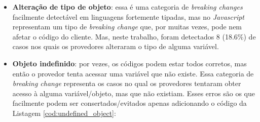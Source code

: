 \begin{itemize}

    \item \textbf{Alteração de tipo de objeto}: essa é uma categoria de \textit{breaking changes} facilmente detectável em linguagens fortemente tipadas, mas no \textit{Javascript} representam um tipo de \textit{breaking change} que, por muitas vezes, pode nem afetar o código do cliente. Mas, neste trabalho, foram detectados 8 (18.6\%) de casos nos quais os provedores alteraram o tipo de alguma variável.



    \item \textbf{Objeto indefinido}: por vezes, os códigos podem estar todos corretos, mas então o provedor tenta acessar uma variável que não existe. Essa categoria de \textit{breaking change} representa os casos no qual os provedores tentaram obter acesso à alguma variável/objeto, mas que não existiam. Esses erros são os que facilmente podem ser consertados/evitados apenas adicionando o código da Listagem \ref{cod:undefined_object}:


\end{itemize}
